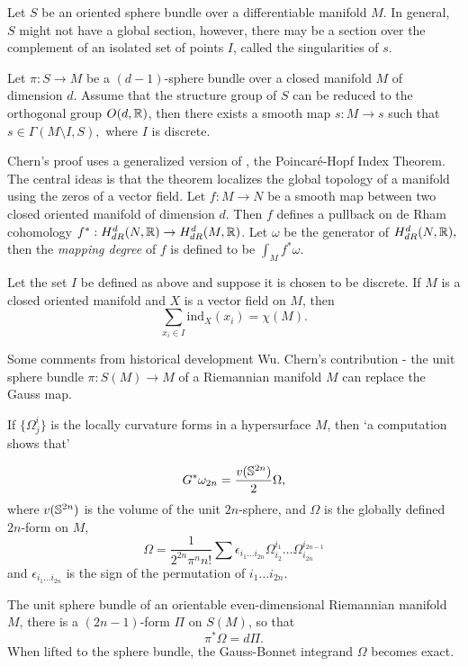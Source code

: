 Let $S$ be an oriented sphere bundle over a differentiable manifold $M$.
In general, $S$ might not have a global section, however, there may be a section over
the complement of an isolated set of points $I$, called the singularities of $s$.

\begin{theorem}[Singularities]
Let $\pi: S\rightarrow M$ be a $(d-1)$-sphere bundle over a closed manifold $M$ of dimension $d$.
Assume that the structure group of $S$ can be reduced to the orthogonal group $O(d,\mathbb{R})$, then there exists
a smooth map $s:M\rightarrow s$ such that $s\in \Gamma(M\setminus I, S),$ where $I$ is discrete.
\end{theorem}

Chern's proof uses a generalized version of , the Poincar\'e-Hopf Index Theorem.
The central ideas is that the theorem localizes the global topology of a manifold using the zeros of a vector field.
Let $f:M\rightarrow N$ be a smooth map between two closed oriented manifold of dimension $d$.
Then $f$ defines a pullback on de Rham cohomology $f^*:H_{dR}^d(N,\mathbb{R})\rightarrow H_{dR}^d(M,\mathbb{R})$.
Let $\omega$ be the generator of $H_{dR}^d(N,\mathbb{R}),$ then the \emph{mapping degree}
of $f$ is defined to be $\int_Mf^*\omega.$

\begin{theorem}\label{thm:gph}
Let the set $I$ be defined as above and suppose it is chosen to be discrete.
If $M$ is a closed oriented manifold and $X$ is a vector field on $M$, then
$$\sum_{x_i\in I} \text{ind}_X(x_i)=\chi(M).$$
\end{theorem}


Some comments from historical development Wu.
Chern's contribution - the unit sphere bundle $\pi: S(M)\rightarrow M$
of a Riemannian manifold $M$ can replace the Gauss map.

If $\{\Omega_j^i\}$ is the locally curvature forms in a hypersurface $M$,
then `a computation shows that'

$$G^*\omega_{2n}=\frac{v(\mathbb{S}^{2n})}{2}\Omega,$$
where $v(\mathbb{S}^{2n})$ is the volume of the unit $2n$-sphere, and $\Omega$
is the globally defined $2n$-form on $M$,
$$\Omega=\frac{1}{2^{2n}\pi^n n!}\sum \epsilon_{i_1\ldots i_{2n}}\Omega_{i_2}^{i_1}\ldots \Omega_{i_{2n}}^{i_{2n-1}}$$ 
and $\epsilon_{i_1\ldots i_{2n}}$ is the sign of the permutation
of $i_1\ldots i_{2n}$.


The unit sphere bundle of an orientable even-dimensional Riemannian manifold 
$M$, there is a $(2n-1)$-form $\Pi$ on $S(M)$,
so that 
$$\pi^*\Omega = d\Pi.$$
When lifted to the sphere bundle, the Gauss-Bonnet integrand $\Omega$ 
becomes exact.

